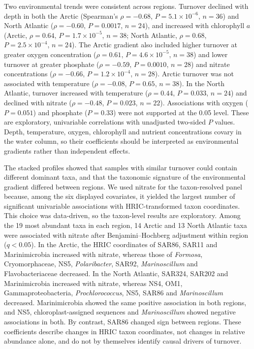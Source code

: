 Two environmental trends were consistent across regions. Turnover declined
with depth in both the Arctic (Spearman's $\rho=-0.68$, $P=5.1\times10^{-6}$,
$n=36$) and North Atlantic ($\rho=-0.60$, $P=0.0017$, $n=24$), and increased
with chlorophyll $a$ (Arctic, $\rho=0.64$, $P=1.7\times10^{-5}$, $n=38$;
North Atlantic, $\rho=0.68$, $P=2.5\times10^{-4}$, $n=24$). The Arctic
gradient also included higher turnover at greater oxygen concentration
($\rho=0.61$, $P=4.6\times10^{-5}$, $n=38$) and lower turnover at greater
phosphate ($\rho=-0.59$, $P=0.0010$, $n=28$) and nitrate concentrations
($\rho=-0.66$, $P=1.2\times10^{-4}$, $n=28$). Arctic turnover was not
associated with temperature ($\rho=-0.08$, $P=0.65$, $n=38$). In the North
Atlantic, turnover increased with temperature ($\rho=0.44$, $P=0.033$,
$n=24$) and declined with nitrate ($\rho=-0.48$, $P=0.023$, $n=22$).
Associations with oxygen ($P=0.051$) and phosphate ($P=0.33$) were not
supported at the 0.05 level. These are exploratory, univariable correlations
with unadjusted two-sided $P$ values. Depth, temperature, oxygen, chlorophyll
and nutrient concentrations covary in the water column, so their coefficients
should be interpreted as environmental gradients rather than independent
effects.

The stacked profiles showed that samples with similar turnover could contain
different dominant taxa, and that the taxonomic signature of the environmental
gradient differed between regions. We used nitrate for the taxon-resolved
panel because, among the six displayed covariates, it yielded the largest
number of significant univariable associations with HRIC-transformed taxon
coordinates. This choice was data-driven, so the taxon-level results are
exploratory. Among the 19 most abundant taxa in each region, 14 Arctic and 13
North Atlantic taxa were associated with nitrate after Benjamini--Hochberg
adjustment within region ($q<0.05$). In the Arctic, the HRIC coordinates of
SAR86, SAR11 and Marinimicrobia increased with nitrate, whereas those of
\textit{Formosa}, Cryomorphaceae, NS5, \textit{Polaribacter}, SAR92,
\textit{Marinoscillum} and Flavobacteriaceae decreased. In the North Atlantic,
SAR324, SAR202 and Marinimicrobia increased with nitrate, whereas NS4, OM1,
Gammaproteobacteria, \textit{Prochlorococcus}, NS5, SAR86 and
\textit{Marinoscillum} decreased. Marinimicrobia showed the same positive
association in both regions, and NS5, chloroplast-assigned sequences and
\textit{Marinoscillum} showed negative associations in both. By contrast,
SAR86 changed sign between regions. These coefficients describe changes in
HRIC taxon coordinates, not changes in relative abundance alone, and do not by
themselves identify causal drivers of turnover.

